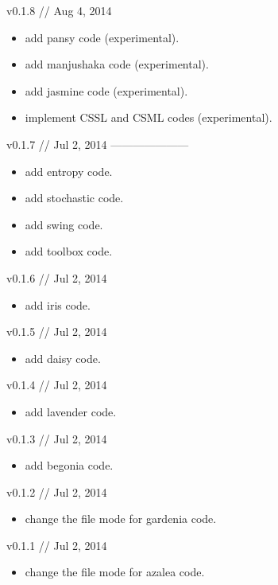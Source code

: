 v0.1.8 // Aug 4, 2014

\begin{itemize}
\item add pansy code (experimental).
\item add manjushaka code (experimental).
\item add jasmine code (experimental).
\item implement CSSL and CSML codes (experimental).
\end{itemize}


v0.1.7 // Jul 2, 2014
---------------------

\begin{itemize}
\item add entropy code.
\item add stochastic code.
\item add swing code.
\item add toolbox code.
\end{itemize}


v0.1.6 // Jul 2, 2014

\begin{itemize}
\item add iris code.
\end{itemize}


v0.1.5 // Jul 2, 2014

\begin{itemize}
\item add daisy code.
\end{itemize}


v0.1.4 // Jul 2, 2014

\begin{itemize}
\item add lavender code.
\end{itemize}


v0.1.3 // Jul 2, 2014

\begin{itemize}
\item add begonia code.
\end{itemize}


v0.1.2 // Jul 2, 2014

\begin{itemize}
\item change the file mode for gardenia code.
\end{itemize}


v0.1.1 // Jul 2, 2014

\begin{itemize}
\item change the file mode for azalea code.
\end{itemize}


